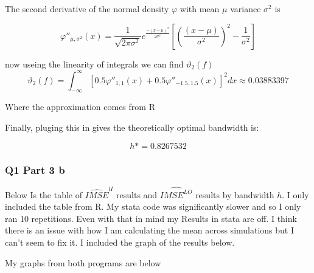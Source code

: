 \documentclass[11pt]{article}
\begin{document}
The second derivative of the normal density $\varphi$ with mean $\mu$ variance $\sigma^2$ is 

$$\varphi''_{\mu, \sigma^2}(x) = \frac{1}{\sqrt{2 \pi \sigma^2 }}e^{\frac{-(x-\mu)^2}{2\sigma^2}} \left[ \left( \frac{(x - \mu)}{\sigma^2} \right)^2 - \frac{1}{\sigma^2} \right]
$$

now useing the linearity of integrals we can find $\vartheta_{2}(f)$
$$ \vartheta_{2}(f) = \int_{-\infty}^{\infty} [0.5 \varphi''_{1,1}(x) + 0.5 \varphi''_{-1.5, 1.5}(x)]^2dx \approx 0.03883397
$$

Where the approximation comes from R 

Finally, pluging this in gives the theoretically optimal bandwidth is: 

$$h* = 0.8267532
$$

\subsubsection{Q1 Part 3 b}

Below Is the table of $\widehat{IMSE}^{lI}$ results and $\widehat{IMSE^{LO}}$ results by bandwidth $h$. I only included the table from R. My stata code was significantly slower and so I only ran 10 repetitions. Even with that in mind my Results in stata are off. I think there is an issue with how I am calculating the mean across simulations but I can't seem to fix it. I included the graph of the results below.

\begin{center}
	
\end{center}

My graphs from both programs are below 
\end{document}
